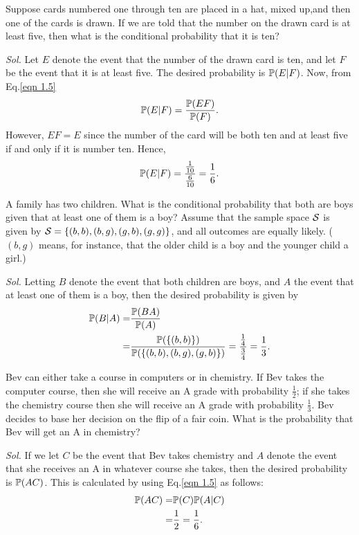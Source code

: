 \begin{example}
    Suppose cards numbered one through ten are placed in a hat, mixed up,and then one of the cards is drawn. If we are told that the number on the drawn card is at least five, then what is the conditional probability that it is ten?

    \textit{ Sol. } Let $E$ denote the event that the number of the drawn card is ten, and let $F$ be the event that it is at least five. The desired probability is $\mathbb{P} (E|F)$. Now, from Eq.\eqref{eqn 1.5} 
    \begin{equation*}
        \mathbb{P} (E | F) = \frac{\mathbb{P}(EF)}{\mathbb{P}(F)}.
    \end{equation*}
    However, $EF = E$ since the number of the card will be both ten and at least five if and only if it is number ten. Hence, 
    \begin{equation*}
        \mathbb{P} (E | F) = \frac{\frac{1}{10}}{\frac{6}{10}} = \frac{1}{6}.
    \end{equation*}
\end{example}

\begin{example}
    A family has two children. What is the conditional probability that both are boys given that at least one of them is a boy? Assume that the sample space $\mathcal{S}$ is given by $\mathcal{S} = \{ (b, b), (b, g), (g, b), (g, g) \}$, and all outcomes are equally likely. ($(b, g)$ means, for instance, that the older child is a boy and the younger child a girl.)

    \textit{ Sol. } Letting $B$ denote the event that both children are boys, and $A$ the event that at least one of them is a boy, then the desired probability is given by
    \begin{align*}
        \mathbb{P} (B | A) = & \frac{\mathbb{P}(BA)}{\mathbb{P}(A)} \\ 
        = & \frac{ \mathbb{P} (\{ (b,b) \})}{\mathbb{P} (\{ (b,b), (b,g), (g,b)\})}
        = \frac{\frac{1}{4}}{\frac{3}{4}} 
        = \frac{1}{3}.
    \end{align*}
\end{example}

\begin{example}
    Bev can either take a course in computers or in chemistry. If Bev takes the computer course, then she will receive an A grade with probability $\frac{1}{2}$; if she takes the chemistry course then she will receive an A grade with probability $\frac{1}{3}$. Bev decides
    to base her decision on the flip of a fair coin. What is the probability that Bev will get an A in chemistry?

    \textit{ Sol. } If we let $C$ be the event that Bev takes chemistry and $A$ denote the event that she receives an A in whatever course she takes, then the desired probability is $\mathbb{P} (AC)$. This is calculated by using Eq.\eqref{eqn 1.5} as follows:
    \begin{align*}
        \mathbb{P}(AC) = & \mathbb{P} (C) \mathbb{P} (A | C) \\ 
        = & \frac{1}{2} = \frac{1}{6}.
    \end{align*}
\end{example}

